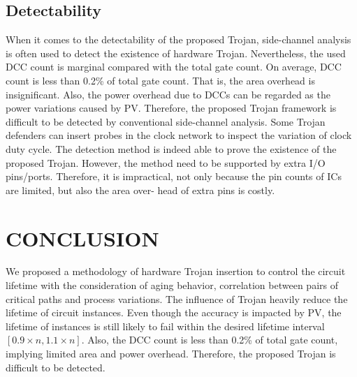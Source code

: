\subsection{Detectability}
\label{sec:exp:det}
When it comes to the detectability of the proposed Trojan, side-channel analysis is often used to detect the existence of hardware Trojan. Nevertheless, the used DCC count is marginal compared with the total gate count. On average, DCC count is less than 0.2\% of total gate count. That is, the area overhead is insignificant. Also, the power overhead due to DCCs can be regarded as the power variations caused by PV. Therefore, the proposed Trojan framework is difficult to be detected by conventional side-channel analysis.
Some Trojan defenders can insert probes in the clock network to inspect the variation of clock duty cycle. The detection method is indeed able to prove the existence of the proposed Trojan. However, the method need to be supported by extra I/O pins/ports. Therefore, it is impractical, not only because the pin counts of ICs are limited, but also the area over- head of extra pins is costly.

\section{CONCLUSION}
We proposed a methodology of hardware Trojan insertion to control the circuit lifetime with the consideration of aging behavior, correlation between pairs of critical paths and process variations. The influence of Trojan heavily reduce the lifetime of circuit instances. Even though the accuracy is impacted by PV, the lifetime of instances is still likely to fail within the desired lifetime interval $[0.9 \times n, 1.1 \times n]$. Also, the DCC count is less than 0.2\% of total gate count, implying limited area and power overhead. Therefore, the proposed Trojan is difficult to be detected.
